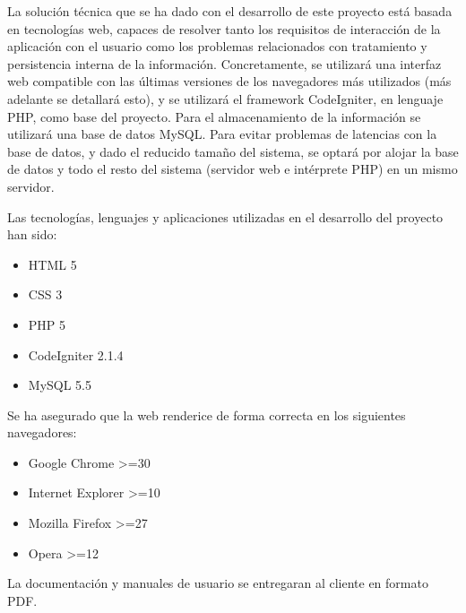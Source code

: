 La solución técnica que se ha dado con el desarrollo de este proyecto está basada en tecnologías web, capaces de resolver tanto los requisitos de interacción de la aplicación con el usuario como los problemas relacionados con tratamiento y persistencia interna de la información.
Concretamente, se utilizará una interfaz web compatible con las últimas versiones de los navegadores más utilizados (más adelante se detallará esto), y se utilizará el framework CodeIgniter, en lenguaje PHP, como base del proyecto. Para el almacenamiento de la información se utilizará una base de datos MySQL.
Para evitar problemas de latencias con la base de datos, y dado el reducido tamaño del sistema, se optará por alojar la base de datos y todo el resto del sistema (servidor web e intérprete PHP) en un mismo servidor.

Las tecnologías, lenguajes y aplicaciones utilizadas en el desarrollo del proyecto han sido:

\begin{itemize}
\item HTML 5
\item CSS 3
\item PHP 5
\item CodeIgniter 2.1.4
\item MySQL 5.5
\end{itemize}

Se ha asegurado que la web renderice de forma correcta en los siguientes navegadores:

\begin{itemize}
\item Google Chrome >=30
\item Internet Explorer >=10
\item Mozilla Firefox >=27
\item Opera >=12
\end{itemize}

La documentación y manuales de usuario se entregaran al cliente en formato PDF.

